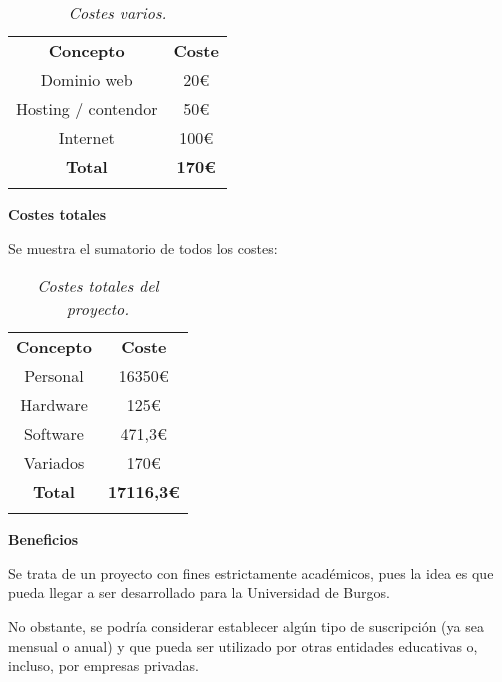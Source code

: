 \begin{table}[H]
    \centering
    \begin{tabular}{| c | c |}\hline
        \Xhline{2\arrayrulewidth}
        \textbf{Concepto} & \textbf{Coste} \\ \Xhline{2\arrayrulewidth}
        Dominio web & 20€ \\ \hline
        Hosting / contendor & 50€\\ \hline
        Internet & 100€ \\ \hline
        \Xhline{2\arrayrulewidth}
        \textbf{Total} & \textbf{170€} \\ \Xhline{2\arrayrulewidth}
    \end{tabular}
    \caption{\textit{Costes varios.}}
\end{table}

\textbf{Costes totales}

Se muestra el sumatorio de todos los costes:

\begin{table}[H]
    \centering
    \begin{tabular}{| c | c |}\hline
        \Xhline{2\arrayrulewidth}
        \textbf{Concepto} & \textbf{Coste} \\ \Xhline{2\arrayrulewidth}
        Personal & 16350€ \\ \hline
        Hardware & 125€\\ \hline
        Software & 471,3€ \\ \hline
        Variados & 170€ \\ \hline
        \Xhline{2\arrayrulewidth}
        \textbf{Total} & \textbf{17116,3€} \\ \Xhline{2\arrayrulewidth}
    \end{tabular}
    \caption{\textit{Costes totales del proyecto.}}
\end{table}

\textbf{Beneficios}

Se trata de un proyecto con fines estrictamente académicos, pues la idea es que pueda llegar a ser desarrollado para
la Universidad de Burgos.

No obstante, se podría considerar establecer algún tipo de suscripción (ya sea mensual o anual) y que pueda ser
utilizado por otras entidades educativas o, incluso, por empresas privadas.

